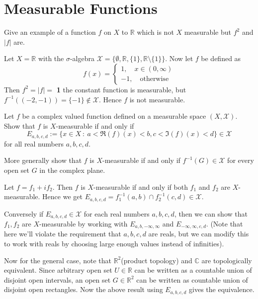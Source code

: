 
\chapter{Measurable Functions}

\begin{exercise}[I]
	Give an example of a function $f$ on $X$ to $\mathbb{R}$ which is not $X$ measurable but $f^2$ and $|f|$ are.
\end{exercise}
\begin{solution}
	Let $X = \mathbb{R}$ with the $\sigma$-algebra $\mathcal{X} = \{ \emptyset, \mathbb{R}, \{ 1 \}, \mathbb{R} \setminus \{ 1 \} \}$. Now let $f$ be defined as \[
		f(x) = \begin{cases}
			1, \quad x \in (0, \infty) \\
			-1, \quad \textrm{otherwise}
		\end{cases}
	\]
	Then $f^2 = |f| =$ \textbf{1} the constant function is measurable, but $f^{-1}((-2, -1)) = \{ -1 \} \notin \mathcal{X}$. Hence $f$ is not measurable.
\end{solution}

\begin{exercise}[S]
	Let $f$ be a complex valued function defined on a measurable space $(X, \mathcal{X})$. Show that $f$ is $X$-measurable if and only if \[
		E_{a, b, c, d} := \{ x \in X \ : \ a < \Re(f)(x) < b, c < \Im(f)(x) < d \} \in \mathcal{X}\] for all real numbers $a, b, c, d$.

	More generally show that $f$ is $X$-measurable if and only if $f^{-1}(G) \in \mathcal{X}$ for every open set $G$ in the complex plane.
\end{exercise}
\begin{solution}
	Let $f = f_1 + if_2$. Then $f$ is $X$-measurable if and only if both $f_1$ and $f_2$ are $X$-measurable. Hence we get $E_{a, b, c, d} = f_1^{-1}(a, b) \cap f_2^{-1}(c, d) \in \mathcal{X}$.

	Conversely if $E_{a, b, c, d} \in \mathcal{X}$ for each real numbers $a, b, c, d$, then we can show that $f_1, f_2$ are $X$-measurable by working with $E_{a, b, -\infty, \infty}$ and $E_{-\infty, \infty, c, d}$. (Note that here we'll violate the requirement that $a, b, c, d$ are reals, but we can modify this to work with reals by choosing large enough values instead of infinities).

	Now for the general case, note that $\mathbb{R}^2$(product topology) and $\mathbb{C}$ are topologically equivalent. Since arbitrary open set $U \in \mathbb{R}$ can be written as a countable union of disjoint open intervals, an open set $G \in \mathbb{R}^2$ can be written as countable union of disjoint open rectangles. Now the above result using $E_{a, b, c, d}$ gives the equivalence.
\end{solution}

